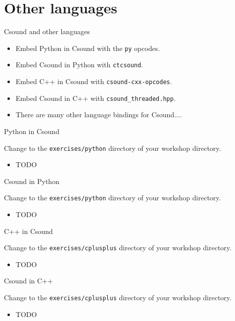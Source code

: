 \documentclass{beamer}
\begin{document}
\section{Other languages}
\begin{frame}{Csound and other languages}
\begin{itemize}
\item Embed Python in Csound with the \texttt{py} opcodes.
\item Embed Csound in Python with \texttt{ctcsound}.
\item Embed C++ in Csound with \texttt{csound-cxx-opcodes}.
\item Embed Csound in C++ with \texttt{csound\_threaded.hpp}.
\item There are many other language bindings for Csound....
\end{itemize}
\end{frame}

\begin{frame}{Python in Csound}
\begin{example}
Change to the \texttt{exercises/python} directory of your workshop directory.
\begin{itemize}
\item TODO
\end{itemize}
\end{example}
\end{frame}

\begin{frame}{Csound in Python}
\begin{example}
Change to the \texttt{exercises/python} directory of your workshop directory.
\begin{itemize}
\item TODO
\end{itemize}
\end{example}
\end{frame}

\begin{frame}{C++ in Csound}
\begin{example}
Change to the \texttt{exercises/cplusplus} directory of your workshop directory.
\begin{itemize}
\item TODO
\end{itemize}
\end{example}
\end{frame}

\begin{frame}{Csound in C++}
\begin{example}
Change to the \texttt{exercises/cplusplus} directory of your workshop directory.
\begin{itemize}
\item TODO
\end{itemize}
\end{example}
\end{frame}
\end{document}
